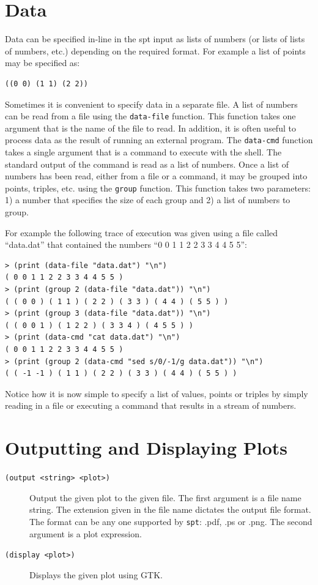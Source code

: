 \documentclass{article}
\begin{document}
\section{Data}

Data can be specified in-line in the spt input as lists of numbers (or
lists of lists of numbers, etc.) depending on the required format.
For example a list of points may be specified as:
\begin{verbatim}
((0 0) (1 1) (2 2))
\end{verbatim}

Sometimes it is convenient to specify data in a separate file.  A list
of numbers can be read from a file using the {\tt data-file} function.
This function takes one argument that is the name of the file to read.
In addition, it is often useful to process data as the result of
running an external program. The {\tt data-cmd} function takes a
single argument that is a command to execute with the shell.  The
standard output of the command is read as a list of numbers.
Once a list of numbers has been read, either from a file or a command,
it may be grouped into points, triples, etc. using the {\tt group}
function.  This function takes two parameters: 1) a number that
specifies the size of each group and 2) a list of numbers to group.

For example the following trace of execution was given using a file
called ``data.dat'' that contained the numbers ``0 0 1 1 2 2 3 3 4 4 5
5'':
\begin{verbatim}
> (print (data-file "data.dat") "\n")
( 0 0 1 1 2 2 3 3 4 4 5 5 )
> (print (group 2 (data-file "data.dat")) "\n")
( ( 0 0 ) ( 1 1 ) ( 2 2 ) ( 3 3 ) ( 4 4 ) ( 5 5 ) )
> (print (group 3 (data-file "data.dat")) "\n")
( ( 0 0 1 ) ( 1 2 2 ) ( 3 3 4 ) ( 4 5 5 ) )
> (print (data-cmd "cat data.dat") "\n")
( 0 0 1 1 2 2 3 3 4 4 5 5 )
> (print (group 2 (data-cmd "sed s/0/-1/g data.dat")) "\n")
( ( -1 -1 ) ( 1 1 ) ( 2 2 ) ( 3 3 ) ( 4 4 ) ( 5 5 ) )
\end{verbatim}
Notice how it is now simple to specify a list of values, points or
triples by simply reading in a file or executing a command that
results in a stream of numbers.

\section{Outputting and Displaying Plots}

\begin{description}
\item[{\tt (output <string> <plot>)}]
Output the given plot to the given
file.  The first argument is a file name string.  The extension given
in the file name dictates the output file format.  The format can be
any one supported by {\tt spt}: .pdf, .ps or .png.  The second
argument is a plot expression.

\item [{\tt (display <plot>)}] Displays the given plot using GTK.
\end{description}
\end{document}
